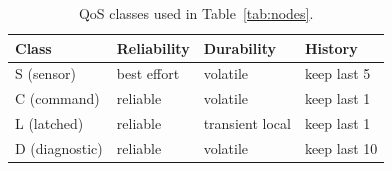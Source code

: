 \documentclass[11pt,a4paper]{article}
\begin{document}
\begin{table}[htb]
\centering\small
\caption{QoS classes used in Table~\ref{tab:nodes}.}
\label{tab:qos}
\begin{tabular}{@{}llll@{}}
\toprule
\textbf{Class} & \textbf{Reliability} & \textbf{Durability} & \textbf{History} \\
\midrule
S (sensor)    & best effort & volatile        & keep last 5 \\
C (command)   & reliable    & volatile        & keep last 1 \\
L (latched)   & reliable    & transient local & keep last 1 \\
D (diagnostic)& reliable    & volatile        & keep last 10 \\
\bottomrule
\end{tabular}
\end{table}
\end{document}
